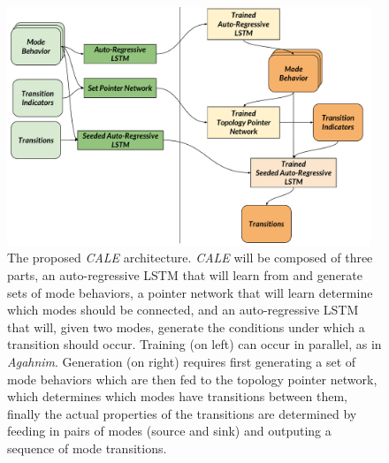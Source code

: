 \documentclass[12pt]{report}
\begin{document}
\begin{figure}[htbp!]
\centering
    \includegraphics[width=0.97\textwidth]{figures/CALE_Architecture.pdf} 
   
    \caption{The proposed \textit{CALE} architecture.  \textit{CALE} will be composed of three parts, an auto-regressive LSTM that will learn from and generate sets of mode behaviors, a pointer network that will learn determine which modes should be connected, and an auto-regressive LSTM that will, given two modes, generate the conditions under which a transition should occur. Training (on left) can occur in parallel, as in \textit{Agahnim}.  Generation (on right) requires first generating a set of mode behaviors which are then fed to the topology pointer network, which determines which modes have transitions between them, finally the actual properties of the transitions are determined by feeding in pairs of modes (source and sink) and outputing a sequence of mode transitions.}
  \label{fig:cale}
  \end{figure}
  
\end{document}

